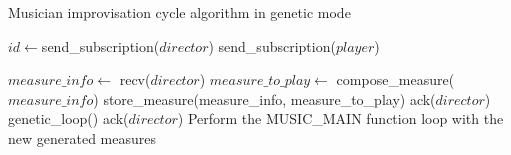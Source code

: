 
\begin{algorithm}
\caption{Musician improvisation cycle algorithm in genetic mode}\label{algo-musician-get}
\begin{algorithmic}[1]
	\State $id \gets$send\_subscription($director$)
	\State send\_subscription($player$)
	
	\State $measure\_info \gets$ recv($director$)
	\State $measure\_to\_play \gets$ compose\_measure($measure\_info$)
	\State store\_measure(measure\_info, measure\_to\_play)
	\State ack($director$)
	\EndWhile
	\State genetic\_loop()	
	\State ack($director$)
	\State Perform the MUSIC\_MAIN function loop with the new generated measures
\EndFunction
\end{algorithmic}
\end{algorithm}

